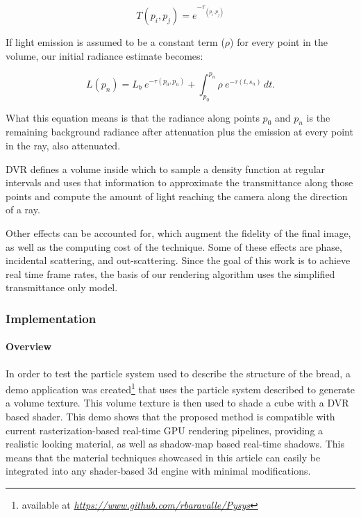 \documentclass[oneside,a4paper,english,links]{amca}
\begin{document}
\begin{equation} \label{eq:general_radiance}  
  T(p_i,p_j) = e^{-\tau_{(p_i, p_j)}}
\end{equation}

If light emission is assumed to be a constant term ($\rho$) for
every point in the volume, our initial radiance estimate becomes:

\begin{equation} \label{eq:ray_radiance}  
  L(p_n) = L_b \ e^{-\tau(p_0, p_n)} + \int_{p_0}^{p_n} \rho \ e^{-\tau(t,s_n)} \, dt.
\end{equation}

What this equation means is that the radiance along points $p_0$ and
$p_n$ is the remaining background radiance after attenuation plus the
emission at every point in the ray, also attenuated.

DVR defines a volume inside which to sample a density function at
regular intervals and uses that information to approximate the
transmittance along those points and compute the amount of light
reaching the camera along the direction of a ray. 

Other effects can be accounted for, which augment the fidelity of the
final image, as well as the computing cost of the technique. Some of
these effects are phase, incidental scattering, and
out-scattering. Since the goal of this work is to achieve real time
frame rates, the basis of our rendering algorithm uses the simplified
transmittance only model.

\subsubsection{Implementation}

\paragraph{Overview}

In order to test the particle system used to describe the structure of
the bread, a demo application was created\footnote{available at
  \emph{\url{https://www.github.com/rbaravalle/Pysys}}} that uses the particle
system described to generate a volume texture. This volume texture is
then used to shade a cube with a DVR based shader. This demo shows
that the proposed method is compatible with current
rasterization-based real-time GPU rendering pipelines, providing a
realistic looking material, as well as shadow-map based real-time
shadows. This means that the material techniques showcased in this
article  can easily be integrated into any shader-based 3d engine with
minimal modifications.
\end{document}
